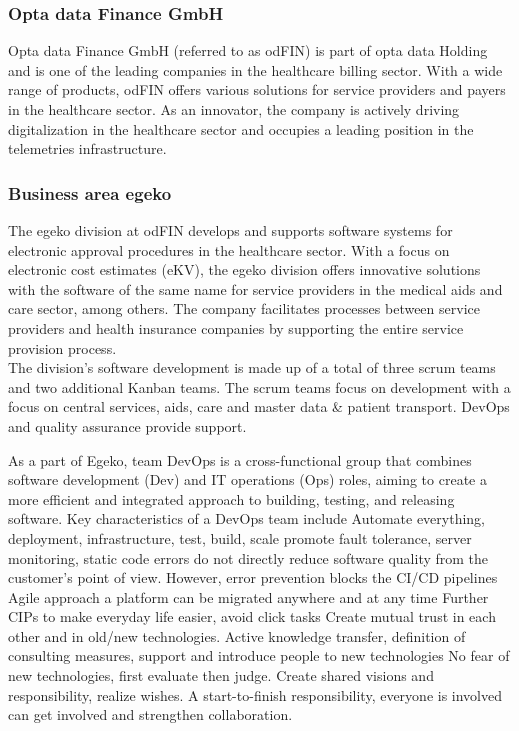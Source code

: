 \subsubsection{Opta data Finance GmbH  }
Opta data Finance GmbH (referred to as odFIN) is part of opta data Holding and is one of the leading companies in the healthcare billing sector. With a wide range of products, odFIN offers various solutions for service providers and payers in the healthcare sector. As an innovator, the company is actively driving digitalization in the healthcare sector and occupies a leading position in the telemetries infrastructure.

\subsubsection{Business area egeko }
The egeko division at odFIN develops and supports software systems for electronic approval procedures in the healthcare sector. With a focus on electronic cost estimates (eKV), the egeko division offers innovative solutions with the software of the same name for service providers in the medical aids and care sector, among others. The company facilitates processes between service providers and health insurance companies by supporting the entire service provision process.\\
The division's software development is made up of a total of three scrum teams and two additional Kanban teams. The scrum teams focus on development with a focus on central services, aids, care and master data \& patient transport. DevOps and quality assurance provide support.\vspace{.4cm} 

As a part of Egeko, team DevOps is a cross-functional group that combines software development (Dev) and IT operations (Ops) roles, aiming to create a more efficient and integrated approach to building, testing, and releasing software. Key characteristics of a DevOps team include Automate everything, deployment, infrastructure, test, build, scale promote fault tolerance, server monitoring, static code errors do not directly reduce software quality from the customer's point of view. However, error prevention blocks the CI/CD pipelines Agile approach a platform can be migrated anywhere and at any time Further CIPs to make everyday life easier, avoid click tasks Create mutual trust in each other and in old/new technologies. Active knowledge transfer, definition of consulting measures, support and introduce people to new technologies No fear of new technologies, first evaluate then judge. Create shared visions and responsibility, realize wishes. A start-to-finish responsibility, everyone is involved can get involved and strengthen collaboration.\vspace{.4cm}

